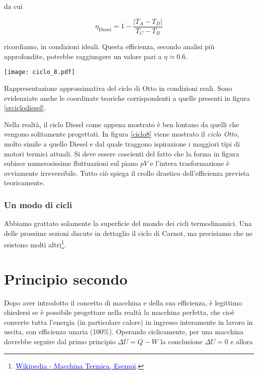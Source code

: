 \noindent da cui

\[ \eta_\text{Diesel} = 1 - \frac{|T_A - T_D|}{T_C - T_B} \]

\noindent ricordiamo, in condizioni ideali. Questa efficienza,
secondo analisi più approfondite, potrebbe raggiungere un
valore pari a $\eta \simeq 0.6$.

\begin{marginfigure}
    \centering
    \texttt{[image: ciclo\_8.pdf]}
    \caption{Rappresentazione approssimativa del ciclo di Otto in
    condizioni reali. Sono evidenziate anche le coordinate teoriche
    corrispondenti a quelle presenti in figura \ref{erciclodiesel}.}
    \label{ciclo8}
\end{marginfigure}

Nella realtà, il ciclo Diesel come appena mostrato è ben lontano
da quelli che vengono solitamente progettati. In figura \ref{ciclo8}
viene mostrato il \textit{ciclo Otto}, molto simile a quello Diesel
e dal quale traggono ispirazione i maggiori tipi di motori termici
attuali. Si deve essere coscienti del fatto che la forma in figura
subisce numerosissime fluttuazioni sul piano $pV$ e l'intera trasformazione
è ovviamente irreversibile. Tutto ciò spiega il crollo drastico
dell'efficienza prevista teoricamente.

\subsubsection*{Un modo di cicli}
Abbiamo grattato solamente la superficie del mondo dei cicli termodinamici.
Una delle prossime sezioni discute in dettaglio il ciclo di Carnot,
ma precisiamo che ne esistono molti altri\footnote{\href{https://it.wikipedia.org/wiki/Macchina_termica}{\textcolor{blue}{Wikipedia - Macchina Termica, Esempi}}.}.





\section{Principio secondo}
Dopo aver introdotto il concetto di macchina e della sua efficienza,
è legittimo chiedersi se è possibile progettare nella realtà
la macchina perfetta, che cioè converte tutta l'energia
(in particolare calore) in ingresso interamente in lavoro in uscita,
con efficienza unaria (100\%).
Operando ciclicamente, per una macchina dovrebbe seguire dal primo
principio $\Delta U = Q - W$ la conclusione $\Delta U = 0$ e allora

